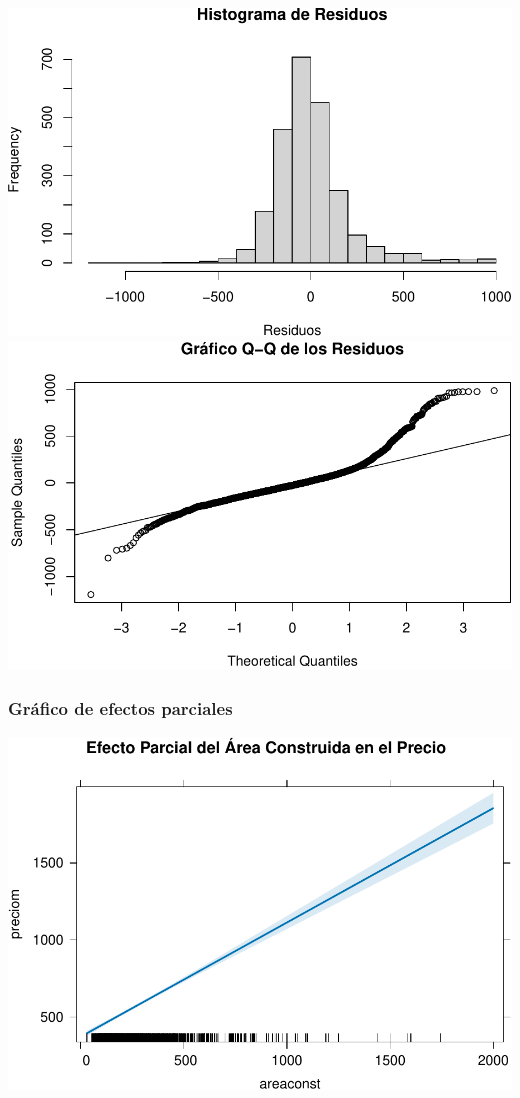 \documentclass[
]{article}
\begin{document}
\includegraphics{A2_U2_InformeEjecutivo_files/figure-latex/unnamed-chunk-18-1.pdf}
\includegraphics{A2_U2_InformeEjecutivo_files/figure-latex/unnamed-chunk-18-2.pdf}

\subsubsection{\texorpdfstring{\textbf{Gráfico de efectos
parciales}}{Gráfico de efectos parciales}}\label{gruxe1fico-de-efectos-parciales}

\includegraphics{A2_U2_InformeEjecutivo_files/figure-latex/unnamed-chunk-19-1.pdf}
\end{document}
